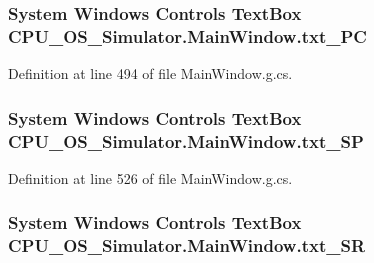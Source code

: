 \subsubsection[{txt\+\_\+\+P\+C}]{\setlength{\rightskip}{0pt plus 5cm}System Windows Controls Text\+Box C\+P\+U\+\_\+\+O\+S\+\_\+\+Simulator.\+Main\+Window.\+txt\+\_\+\+P\+C\hspace{0.3cm}{\ttfamily [package]}}\label{class_c_p_u___o_s___simulator_1_1_main_window_a7100765f8e26fa4c97a76dd445942b97}


Definition at line 494 of file Main\+Window.\+g.\+cs.

\hypertarget{class_c_p_u___o_s___simulator_1_1_main_window_ac2427655774b9ca2b4c368651d5cd9de}{}
\subsubsection[{txt\+\_\+\+S\+P}]{\setlength{\rightskip}{0pt plus 5cm}System Windows Controls Text\+Box C\+P\+U\+\_\+\+O\+S\+\_\+\+Simulator.\+Main\+Window.\+txt\+\_\+\+S\+P\hspace{0.3cm}{\ttfamily [package]}}\label{class_c_p_u___o_s___simulator_1_1_main_window_ac2427655774b9ca2b4c368651d5cd9de}


Definition at line 526 of file Main\+Window.\+g.\+cs.

\hypertarget{class_c_p_u___o_s___simulator_1_1_main_window_a9135c01bacd48e517d7cf46f69ea87d2}{}
\subsubsection[{txt\+\_\+\+S\+R}]{\setlength{\rightskip}{0pt plus 5cm}System Windows Controls Text\+Box C\+P\+U\+\_\+\+O\+S\+\_\+\+Simulator.\+Main\+Window.\+txt\+\_\+\+S\+R\hspace{0.3cm}{\ttfamily [package]}}\label{class_c_p_u___o_s___simulator_1_1_main_window_a9135c01bacd48e517d7cf46f69ea87d2}


